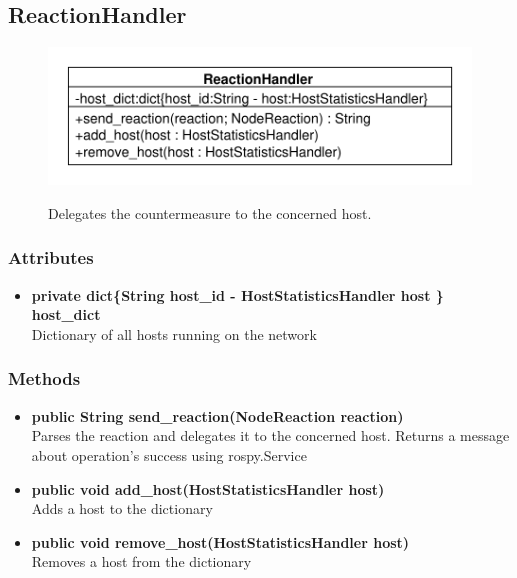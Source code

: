 \subsection{ReactionHandler}
\begin{figure}[htbp]
	\begin{minipage}[t]{7cm}
		\vspace{0pt}
		\centering
		\includegraphics[scale=0.6]{./diagram_pictures/NodeInterface/ReactionHandler.pdf}
	\end{minipage}
	\hfill
	\begin{minipage}[t]{7cm}
		\vspace{10pt}
		Delegates the countermeasure to the concerned host.
	\end{minipage}
\end{figure}


\subsubsection{Attributes}
\begin{itemize}
	\item \textbf{private  dict\{String host\_id  - HostStatisticsHandler host  \} host\_dict}\\
	Dictionary of all hosts running on the network
\end{itemize}

\subsubsection{Methods}
\begin{itemize}
	\item \textbf{public String send\_reaction(NodeReaction reaction)}\\
	Parses the reaction and delegates it to the concerned host.
	Returns a message about operation's success using rospy.Service
	\item \textbf{public void add\_host(HostStatisticsHandler host)}\\
	Adds a host to the dictionary
	\item \textbf{public void remove\_host(HostStatisticsHandler host)}\\
	Removes a host from the dictionary
\end{itemize}

